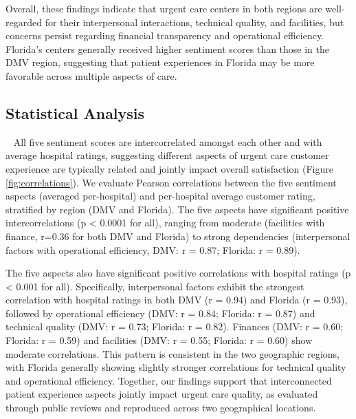 \documentclass[journal,twoside,web]{ieeecolor}
\begin{document}
Overall, these findings indicate that urgent care centers in both regions are well-regarded for their interpersonal interactions, technical quality, and facilities, but concerns persist regarding financial transparency and operational efficiency. Florida's centers generally received higher sentiment scores than those in the DMV region, suggesting that patient experiences in Florida may be more favorable across multiple aspects of care.


\subsection{Statistical Analysis} 
All five sentiment scores are intercorrelated amongst each other and with average hospital ratings, suggesting different aspects of urgent care customer experience are typically related and jointly impact overall satisfaction (Figure \ref{fig:correlations}). We evaluate Pearson correlations between the five sentiment aspects (averaged per-hospital) and per-hospital average customer rating, stratified by region (DMV and Florida). The five aspects have significant positive intercorrelations (p < 0.0001 for all), ranging from moderate (facilities with finance, r=0.36 for both DMV and Florida) to strong dependencies (interpersonal factors with operational efficiency, DMV: r = 0.87; Florida: r = 0.89). 

The five aspects also have significant positive correlations with hospital ratings (p < 0.001 for all). Specifically, interpersonal factors exhibit the strongest correlation with hospital ratings in both DMV (r = 0.94) and Florida (r = 0.93), followed by operational efficiency (DMV: r = 0.84; Florida: r = 0.87) and technical quality (DMV: r = 0.73; Florida: r = 0.82). Finances (DMV: r = 0.60; Florida: r = 0.59) and facilities (DMV: r = 0.55; Florida: r = 0.60) show moderate correlations. This pattern is consistent in the two geographic regions, with Florida generally showing slightly stronger correlations for technical quality and operational efficiency. Together, our findings support that interconnected patient experience aspects jointly impact urgent care quality, as evaluated through public reviews and reproduced across two geographical locations.
\end{document}
